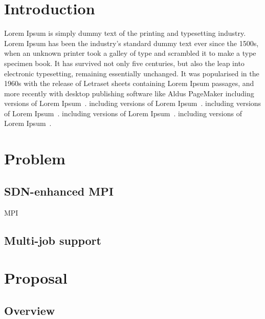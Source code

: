 \documentclass[graybox]{svmult}
\begin{document}
\section{Introduction}

Lorem Ipsum is simply dummy text of the printing and typesetting industry.
Lorem Ipsum has been the industry's standard dummy text ever since the 1500s,
when an unknown printer took a galley of type and scrambled it to make a type
specimen book. It has survived not only five centuries, but also the leap into
electronic typesetting, remaining essentially unchanged. It was popularised in
the 1960s with the release of Letraset sheets containing Lorem Ipsum passages,
and more recently with desktop publishing software like Aldus PageMaker
including versions of Lorem Ipsum~\cite{Takahashi2014}. including versions of
Lorem Ipsum~\cite{Takahashi2015}. including versions of Lorem
Ipsum~\cite{Takahashi2017}. including versions of Lorem
Ipsum~\cite{Takahashi2018}. including versions of Lorem
Ipsum~\cite{Dashdavaa2014}.


\section{Problem}

\subsection{SDN-enhanced MPI}

MPI~\cite{MPIForum2012}

\subsection{Multi-job support}

\section{Proposal}

\subsection{Overview}
\end{document}

